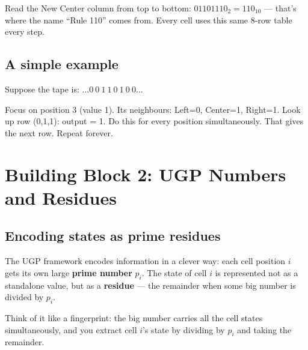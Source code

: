 \documentclass[11pt,a4paper]{article}
\newcommand{\term}[1]{\textbf{#1}}
\begin{document}
Read the New Center column from top to bottom: $01101110_2 = 110_{10}$ — that's
where the name ``Rule 110'' comes from.  Every cell uses this same 8-row
table every step.

\subsection{A simple example}

Suppose the tape is: $\ldots 0\ 0\ 1\ 1\ 0\ 1\ 0\ 0 \ldots$

\begin{center}
\end{center}

Focus on position 3 (value 1).  Its neighbours: Left=0, Center=1, Right=1.
Look up row (0,1,1): output = 1.  Do this for every position simultaneously.
That gives the next row.  Repeat forever.

\section{Building Block 2: UGP Numbers and Residues}

\subsection{Encoding states as prime residues}

The UGP framework encodes information in a clever way: each cell position $i$
gets its own large \term{prime number} $p_i$.  The state of cell $i$ is
represented not as a standalone value, but as a \term{residue} — the
remainder when some big number is divided by $p_i$.

Think of it like a fingerprint: the big number carries all the cell states
simultaneously, and you extract cell $i$'s state by dividing by $p_i$ and
taking the remainder.
\end{document}
